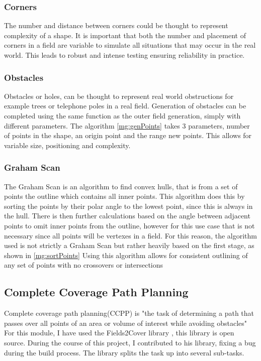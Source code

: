 \documentclass[final]{cmpreport_02}
\begin{document}
\subsubsection{Corners}
The number and distance between corners could be thought to represent complexity of a shape.
It is important that both the number and placement of corners in a field are variable to simulate all situations that may occur in the real world.
This leads to robust and intense testing ensuring reliability in practice.


\subsubsection{Obstacles}
Obstacles or holes, can be thought to represent real world obstructions for example trees or telephone poles in a real field.
Generation of obstacles can be completed using the same function as the outer field generation, simply with different parameters.
The algorithm \ref{mg:genPoints} takes 3 parameters, number of points in the shape, an origin point and the range new points.
This allows for variable size, positioning and complexity.


\subsubsection{Graham Scan}
The Graham Scan \citep{graham1972efficient} is an algorithm to find convex hulls, that is from a set of points the outline which contains all inner points.
This algorithm does this by sorting the points by their polar angle to the lowest point, since this is always in the hull.
There is then further calculations based on the angle between adjacent points to omit inner points from the outline, however for this use case that is not necessary since all points will be vertexes in a field.
For this reason, the algorithm used is not strictly a Graham Scan but rather heavily based on the first stage, as shown in \ref{mg:sortPoints}
Using this algorithm allows for consistent outlining of any set of points with no crossovers or intersections

\subsection{Complete Coverage Path Planning}
Complete coverage path planning(CCPP) is "the task of determining a path that passes over all points of an area or volume of interest while avoiding obstacles" \citep{zhao2023complete}
For this module, I have used the Fields2Cover library \citep{fields2cover}, this library is open source.
During the course of this project, I contributed to his library, fixing a bug during the build process.
The library splits the task up into several sub-tasks.
\end{document}
